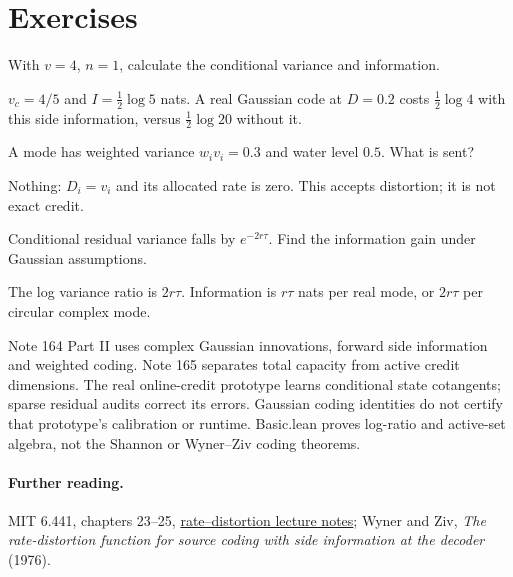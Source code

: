 \documentclass[11pt]{article}
\begin{document}
\section*{Exercises}
\begin{exercise}With $v=4$, $n=1$, calculate the conditional variance and information.\end{exercise}
\begin{solution}$v_c=4/5$ and $I=\tfrac12\log5$ nats. A real Gaussian code at $D=0.2$ costs $\tfrac12\log4$ with this side information, versus $\tfrac12\log20$ without it.\end{solution}
\begin{exercise}A mode has weighted variance $w_iv_i=0.3$ and water level $0.5$. What is sent?\end{exercise}
\begin{solution}Nothing: $D_i=v_i$ and its allocated rate is zero. This accepts distortion; it is not exact credit.\end{solution}
\begin{exercise}Conditional residual variance falls by $e^{-2r\tau}$. Find the information gain under Gaussian assumptions.\end{exercise}
\begin{solution}The log variance ratio is $2r\tau$. Information is $r\tau$ nats per real mode, or $2r\tau$ per circular complex mode.\end{solution}
\begin{inourmodels}
Note 164 Part II uses complex Gaussian innovations, forward side information and weighted coding. Note 165 separates total capacity from active credit dimensions. The real online-credit prototype learns conditional state cotangents; sparse residual audits correct its errors. Gaussian coding identities do not certify that prototype's calibration or runtime. Basic.lean proves log-ratio and active-set algebra, not the Shannon or Wyner--Ziv coding theorems.
\end{inourmodels}
\paragraph{Further reading.} MIT 6.441, chapters 23--25, \href{https://ocw.mit.edu/courses/6-441-information-theory-spring-2016/resources/lecture-notes/}{rate--distortion lecture notes}; Wyner and Ziv, \emph{The rate-distortion function for source coding with side information at the decoder} (1976).
\end{document}
